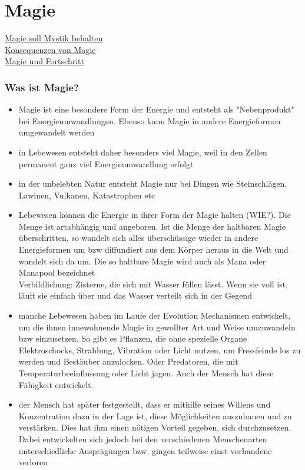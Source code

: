 \chapter{Magie}
\href{http://www.weltenbau-wissen.de/2015/12/magie-weltenbau-magiesystem-mystik-wissenschaft-teil-1/}{Magie soll Mystik behalten}\\
\href{http://www.weltenbau-wissen.de/2016/01/6-konsequenzen-magie/}{Konsequenzen von Magie}\\
\href{https://meisterperson.wordpress.com/2016/05/05/magie-fortschritt/?pk_campaign=pifeed&pk_kwd=magie-fortschritt}{Magie und Fortschritt}

\subsection{Was ist Magie?}
\begin{itemize}
	\item Magie ist eine besondere Form der Energie und entsteht als "Nebenprodukt" bei Energieumwandlungen. Ebenso kann Magie in andere Energieformen umgewandelt werden
	\item in Lebewesen entsteht daher besonders viel Magie, weil in den Zellen permanent ganz viel Energieumwandlung erfolgt
	\item in der unbelebten Natur entsteht Magie nur bei Dingen wie Steinschlägen, Lawinen, Vulkanen, Katastrophen etc
	\item Lebewesen können die Energie in ihrer Form der Magie halten (WIE?). Die Menge ist artabhängig und angeboren. Ist die Menge der haltbaren Magie überschritten, so wandelt sich alles überschüssige wieder in andere Energieformen um bzw diffundiert aus dem Körper heraus in die Welt und wandelt sich da um. Die so haltbare Magie wird auch als Mana oder Manapool bezeichnet \\
	Verbildlichung:  Zisterne, die sich mit Wasser füllen lässt. Wenn sie voll ist, läuft sie einfach über und das Wasser verteilt sich in der Gegend
	\item manche Lebewesen haben im Laufe der Evolution Mechanismen entwickelt, um die ihnen innewohnende Magie in gewollter Art und Weise umzuwandeln bzw einzusetzen. So gibt es Pflanzen, die ohne spezielle Organe Elektroschocks, Strahlung, Vibration oder Licht nutzen, um Fressfeinde los zu werden und Bestäuber anzulocken. Oder Predatoren, die mit Temperaturbeeinflussung oder Licht jagen. Auch der Mensch hat diese Fähigkeit entwickelt.
	\item der Mensch hat später festgestellt, dass er mithilfe seines Willens und Konzentration dazu in der Lage ist, diese Möglichkeiten auszubauen und zu verstärken. Dies hat ihm einen nötigen Vorteil gegeben, sich durchzusetzen. Dabei entwickelten sich jedoch bei den verschiedenen Menschenarten unterschiedliche Ausprägungen bzw. gingen teilweise einst vorhandene verloren

\end{itemize}
